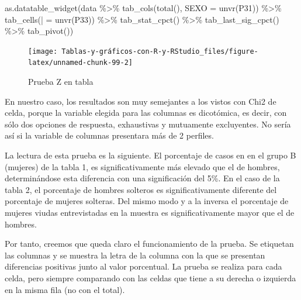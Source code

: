 \documentclass[
]{book}
\newenvironment{Shaded}{\begin{snugshade}}{\end{snugshade}}
\newcommand{\AttributeTok}[1]{\textcolor[rgb]{0.77,0.63,0.00}{#1}}
\newcommand{\FunctionTok}[1]{\textcolor[rgb]{0.00,0.00,0.00}{#1}}
\newcommand{\NormalTok}[1]{#1}
\newcommand{\OtherTok}[1]{\textcolor[rgb]{0.56,0.35,0.01}{#1}}
\newcommand{\SpecialCharTok}[1]{\textcolor[rgb]{0.00,0.00,0.00}{#1}}
\newcommand{\StringTok}[1]{\textcolor[rgb]{0.31,0.60,0.02}{#1}}
\begin{document}
\begin{Shaded}
\begin{Highlighting}[]
\FunctionTok{as.datatable\_widget}\NormalTok{(data }\SpecialCharTok{\%\textgreater{}\%} \FunctionTok{tab\_cols}\NormalTok{(}\FunctionTok{total}\NormalTok{(), }\AttributeTok{SEXO =} \FunctionTok{unvr}\NormalTok{(P31)) }\SpecialCharTok{\%\textgreater{}\%} 
  \FunctionTok{tab\_cells}\NormalTok{(}\StringTok{\textasciigrave{}}\AttributeTok{|}\StringTok{\textasciigrave{}} \OtherTok{=} \FunctionTok{unvr}\NormalTok{(P33)) }\SpecialCharTok{\%\textgreater{}\%} \FunctionTok{tab\_stat\_cpct}\NormalTok{() }\SpecialCharTok{\%\textgreater{}\%} \FunctionTok{tab\_last\_sig\_cpct}\NormalTok{() }\SpecialCharTok{\%\textgreater{}\%} 
  \FunctionTok{tab\_pivot}\NormalTok{())}
\end{Highlighting}
\end{Shaded}

\begin{figure}[H]

{\centering \texttt{[image: Tablas-y-gráficos-con-R-y-RStudio\_files/figure-latex/unnamed-chunk-99-2]} 

}

\caption{Prueba Z en tabla}\label{fig:unnamed-chunk-99}
\end{figure}

En nuestro caso, los resultados son muy semejantes a los vistos con Chi2 de celda, porque la variable elegida para las columnas es dicotómica, es decir, con sólo dos opciones de respuesta, exhaustivas y mutuamente excluyentes. No sería así si la variable de columnas presentara más de 2 perfiles.

La lectura de esta prueba es la siguiente. El porcentaje de casos en en el grupo B (mujeres) de la tabla 1, es significativamente más elevado que el de hombres, determinándose esta diferencia con una significación del 5\%. En el caso de la tabla 2, el porcentaje de hombres solteros es significativamente diferente del porcentaje de mujeres solteras. Del mismo modo y a la inversa el porcentaje de mujeres viudas entrevistadas en la muestra es significativamente mayor que el de hombres.

Por tanto, creemos que queda claro el funcionamiento de la prueba. Se etiquetan las columnas y se muestra la letra de la columna con la que se presentan diferencias positivas junto al valor porcentual. La prueba se realiza para cada celda, pero siempre comparando con las celdas que tiene a su derecha o izquierda en la misma fila (no con el total).
\end{document}
